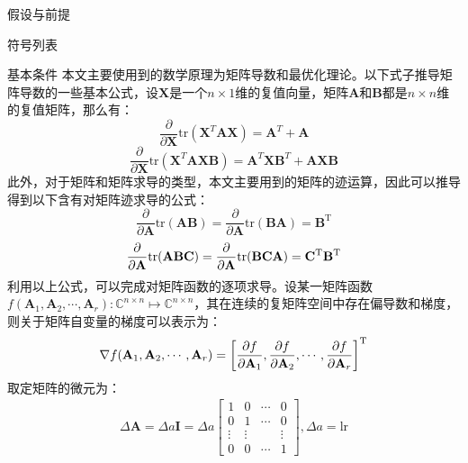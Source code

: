 \documentclass[11pt]{article}
\begin{document}
\begin{section}{假设与前提}
\begin{subsection}{符号列表}
 \end{subsection}
 \begin{subsection}{基本条件}
   本文主要使用到的数学原理为矩阵导数和最优化理论。以下式子推导矩阵导数的一些基本公式，设$\mathbf{X}$是一个$n\times 1$维的复值向量，矩阵$\mathbf{A}$和$\mathbf{B}$都是$n\times n$维的复值矩阵，那么有：
   \begin{equation}
     \label{eq:矩阵导数1}
     \frac{\partial}{\partial \mathbf{X}}\mathrm{tr}(\mathbf{X}^T\mathbf{A}\mathbf{X})=\mathbf{A}^T+\mathbf{A}
   \end{equation}
   \begin{equation}
     \label{eq:矩阵导数2}
     \frac{\partial}{\partial \mathbf{X}}\mathrm{tr}(\mathbf{X}^T\mathbf{A}\mathbf{X}\mathbf{B})=\mathbf{A}^T\mathbf{X}\mathbf{B}^T+\mathbf{A}\mathbf{X}\mathbf{B}
   \end{equation}
   此外，对于矩阵和矩阵求导的类型，本文主要用到的矩阵的迹运算，因此可以推导得到以下含有对矩阵迹求导的公式：
   \begin{equation}
     \label{eq:矩阵导数3}
     \frac{\partial}{\partial \mathbf{A}}\mathrm{tr}(\mathbf{A}\mathbf{B})= \frac{\partial}{\partial \mathbf{A}}\mathrm{tr}(\mathbf{BA})=\mathbf{B}^\mathrm{T}
   \end{equation}
   \begin{equation}
     \label{eq:矩阵导数4}
     \frac{\partial}{\partial \mathbf{A}}\mathrm{tr}(\mathbf{ABC})= \frac{\partial}{\partial \mathbf{A}}\mathrm{tr}(\mathbf{BCA})=\mathbf{C}^\mathrm{T}\mathbf{B}^\mathrm{T}
   \end{equation}
   利用以上公式，可以完成对矩阵函数的逐项求导。设某一矩阵函数$f(\mathbf{A}_1,\mathbf{A}_2,\cdots,\mathbf{A}_r):\mathbb{C}^{n\times n} \longmapsto \mathbb{C}^{n\times n}$，其在连续的复矩阵空间中存在偏导数和梯度，则关于矩阵自变量的梯度可以表示为：
   \begin{align}
     \label{eq:矩阵导数5}
     \nabla f(\mathbf{A}_1,\mathbf{A}_2,\cdots,\mathbf{A}_r)=\left[\frac{\partial{f}}{\partial{\mathbf{A}_1}},\frac{\partial{f}}{\partial{\mathbf{A}_2}},\cdots,\frac{\partial{f}}{\partial{\mathbf{A}_r}}\right]^\mathrm{T}
   \end{align}
   取定矩阵的微元为：
   \begin{align*}
     \Delta \mathbf{A}=\Delta a\mathbf{I}=\Delta a\left[
       \begin{matrix}
         1      & 0      & \cdots & 0      \\
         0      & 1      & \cdots & 0      \\
         \vdots & \vdots &        & \vdots \\
         0      & 0      & \cdots & 1
       \end{matrix}
       \right],\Delta a=\mathrm{lr}
   \end{align*}
 \end{subsection}

\end{section}
\end{document}
